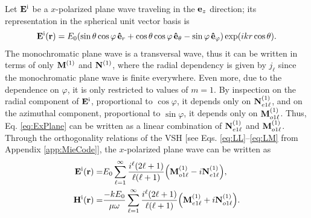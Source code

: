 
 Let $\vb{E}^{\text{i}}$ be a $x$-polarized plane wave traveling in the  $\vb{e}_z$ direction; its representation in the spherical unit vector basis is
 \begin{align}
 \vb{E}^{\text{i}} (\vb{r})= E_0\qty(\sin\theta\cos\varphi \, \vu{e}_r +
					\cos\theta\cos\varphi \,\vu{e}_\theta
					- \sin\varphi \,\vu{e}_\varphi) \exp(ikr\cos\theta).
	\label{eq:ExPlane}
 \end{align}
The monochromatic plane wave is a transversal wave, thus it can be written in terms of only $\vb{M}^{(1)}$ and $\vb{N}^{(1)}$, where the radial dependency is given by $j_\ell$ since the monochromatic plane wave is finite everywhere. Even more, due to the dependence on $\varphi$, it is only restricted to values of $m = 1$. By inspection on the radial component of $\vb{E}^\text{i}$, proportional to $\cos\varphi$, it depends only on $\vb{N}_{e1\ell}^{(1)}$, and on the azimuthal component, proportional to $\sin\varphi$, it depends only on $\vb{M}_{o1\ell}^{(1)}$. Thus, Eq. \eqref{eq:ExPlane} can be written as a linear combination of  $\vb{N}_{e1\ell}^{(1)}$ and $\vb{M}_{o1\ell}^{(1)}$. Through the orthogonality relations of the VSH [see Eqs. \eqref{eq:LL}--\eqref{eq:LM} from Appendix \ref{app:MieCode}], the $x$-polarized plane wave can be written as \cite{stratton_electromagnetic_2012}
%
%
%
%
  \begin{subequations}
 \begin{align}
 \vb{E}^\text{i} (\vb{r})=& E_0 \sum_{\ell = 1}^\infty\frac{i^\ell(2\ell+1)}{\ell(\ell+1)}\qty( \vb{M}_{o1\ell}^{(1)} -i \vb{N}_{e1\ell}^{(1)}),
\\
 \vb{H}^\text{i} (\vb{r})=& \frac{-kE_0}{\mu\omega} \sum_{\ell = 1}^\infty\frac{i^\ell(2\ell+1)}{\ell(\ell+1)}\qty( \vb{M}_{e1\ell}^{(1)} +i \vb{N}_{o1\ell}^{(1)}).
 \end{align}%
 \label{eq:plane waveMultipole}%
   \end{subequations}%
%

